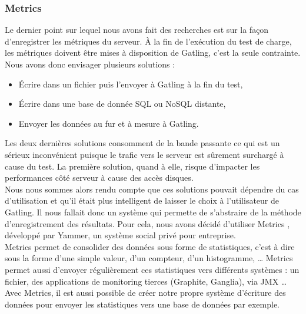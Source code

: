\subsubsection{Metrics}

Le dernier point sur lequel nous avons fait des recherches est sur la façon d'enregistrer les métriques du serveur. À la fin de l'exécution du test de charge, les métriques doivent être mises à disposition de Gatling, c'est la seule contrainte.\\

Nous avons donc envisager plusieurs solutions :

\begin{itemize}
 \item Écrire dans un fichier puis l'envoyer à Gatling à la fin du test,
 \item Écrire dans une base de donnée SQL ou NoSQL distante,
 \item Envoyer les données au fur et à mesure à Gatling.\\
\end{itemize}

Les deux dernières solutions consomment de la bande passante ce qui est un sérieux inconvénient puisque le trafic vers le serveur est sûrement surchargé à cause du test. La première solution, quand à elle, risque d'impacter les performances côté serveur à cause des accès disques.\\

Nous nous sommes alors rendu compte que ces solutions pouvait dépendre du cas d'utilisation et qu'il était plus intelligent de laisser le choix à l'utilisateur de Gatling. Il nous fallait donc un système qui permette de s'abstraire de la méthode d'enregistrement des résultats. Pour cela, nous avons décidé d'utiliser Metrics \cite{metrics}, développé par Yammer, un système social privé pour entreprise.\\

Metrics permet de consolider des données sous forme de statistiques, c'est à dire sous la forme d'une simple valeur, d'un compteur, d'un histogramme, \dots{} Metrics permet aussi d'envoyer régulièrement ces statistiques vers différents systèmes : un fichier, des applications de monitoring tierces (Graphite, Ganglia), via JMX \dots{}\\

Avec Metrics, il est aussi possible de créer notre propre système d'écriture des données pour envoyer les statistiques vers une base de données par exemple.

